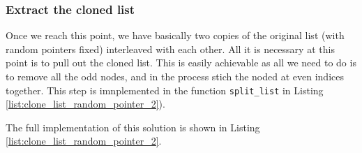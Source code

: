 \subsubsection{Extract the cloned list}
\label{clone_list_random_pointer:sec:interleaved_lists3}
Once we reach this point, we have basically two copies of the original list (with random pointers fixed) interleaved with each other. 
All it is necessary at this point is to pull out the cloned list. 
This is easily achievable as all we need to do is to remove all the odd nodes, and in the process stich the noded at even indices together.
This step is imnplemented in the function \lstinline[columns=fixed]{split_list} in Listing \ref{list:clone_list_random_pointer_2}).

The full implementation of this solution is shown in Listing  \ref{list:clone_list_random_pointer_2}.


